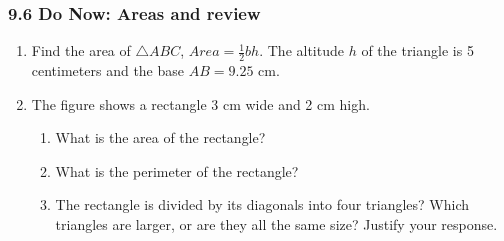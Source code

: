 \documentclass[12pt, twoside]{article}
\begin{document}
\subsubsection*{9.6 Do Now: Areas and review}
 \begin{enumerate}


\item Find the area of $\triangle ABC$,  $Area= \frac{1}{2}bh$. The altitude $h$ of the triangle is 5 centimeters and the base $AB=9.25$ cm.\\[1cm]

 \vspace{1.5cm}

\item The figure shows a rectangle 3 cm wide and 2 cm high.
  \begin{center}
  \end{center}
    \begin{enumerate}
      \item What is the area of the rectangle? \vspace{2.5cm}
      \item What is the perimeter of the rectangle? \vspace{2.5cm}
      \item The rectangle is divided by its diagonals into four triangles? Which triangles are larger, or are they all the same size? Justify your response. \vspace{2cm}
    \end{enumerate}

\newpage


\end{enumerate}
\end{document}
